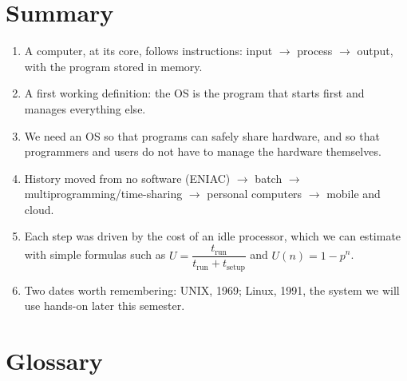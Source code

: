 \documentclass[11pt,a4paper]{article}
\begin{document}
\section{Summary}

\begin{keyidea}
\begin{enumerate}[leftmargin=1.4em]
  \item A computer, at its core, follows instructions: input $\to$ process $\to$ output, with the program stored in memory.
  \item A first working definition: the OS is the program that starts first and manages everything else.
  \item We need an OS so that programs can safely share hardware, and so that programmers and users do not have to manage the hardware themselves.
  \item History moved from no software (ENIAC) $\to$ batch $\to$ multiprogramming/time-sharing $\to$ personal computers $\to$ mobile and cloud.
  \item Each step was driven by the cost of an idle processor, which we can estimate with simple formulas such as $U = \dfrac{t_{\text{run}}}{t_{\text{run}}+t_{\text{setup}}}$ and $U(n) = 1 - p^{n}$.
  \item Two dates worth remembering: UNIX, 1969; Linux, 1991, the system we will use hands-on later this semester.
\end{enumerate}
\end{keyidea}

\section{Glossary}
\end{document}
